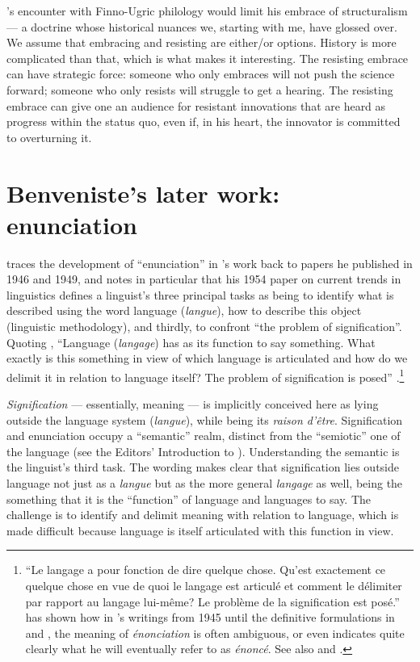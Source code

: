 \documentclass[output=paper]{langscibook}
\begin{document}
{\Sauvageot}'s encounter with Finno-Ugric philology would limit his embrace of structuralism — a doctrine whose historical nuances we, starting with me, have glossed over. We assume that embracing and resisting are either/or options. History is more complicated than that, which is what makes it interesting. The resisting embrace can have strategic force: someone who only embraces will not push the science forward; someone who only resists will struggle to get a hearing. The resisting embrace can give one an audience for resistant innovations that are heard as progress within the status quo, even if, in his heart, the innovator is committed to overturning it.

\section{Benveniste’s later work: enunciation}
\label{sec:joseph:laterwork}

\citet{Normand1986} traces the development of ``enunciation'' in {\Benveniste}'s work back to papers he published in 1946 and 1949, and notes in particular that his 1954 paper on current trends in linguistics defines a linguist's three principal tasks as being to identify what is described using the word language (\emph{langue}), how to describe this object (linguistic methodology), and thirdly, to confront ``the problem of signification''. Quoting {\Benveniste}, ``Language (\emph{langage}) has as its function to say something. What exactly is this something in view of which language is articulated and how do we delimit it in relation to language itself? The problem of signification is posed'' \citep[7]{Benveniste1954}.\footnote{``Le langage a pour fonction de dire quelque chose. Qu'est exactement ce quelque chose en vue de quoi le langage est articulé et comment le délimiter par rapport au langage lui-même? Le problème de la signification est posé.'' \citet[27--57]{Ono2007} has shown how in {\Benveniste}'s writings from 1945 until the definitive formulations in \citeyear{Benveniste1969semiologie} and \citeyear{Benveniste1970appareil}, the meaning of \emph{énonciation} is often ambiguous, or even indicates quite clearly what he will eventually refer to as \emph{énoncé}. See also \citet{Coquet1987} and \citet{JosephInPress}.}

\emph{Signification} — essentially, meaning — is implicitly conceived here as lying outside the language system (\emph{langue}), while being its \emph{raison d’être}. Signification and enunciation occupy a ``semantic'' realm, distinct from the ``semiotic'' one of the language (see the Editors' Introduction to \citealt[49--51]{Benveniste2012}). Understanding the semantic is the linguist's third task. The wording makes clear that signification lies outside language not just as a \emph{langue} but as the more general \emph{langage} as well, being the something that it is the ``function'' of language and languages to say. The challenge is to identify and delimit meaning with relation to language, which is made difficult because language is itself articulated with this function in view.
\end{document}
